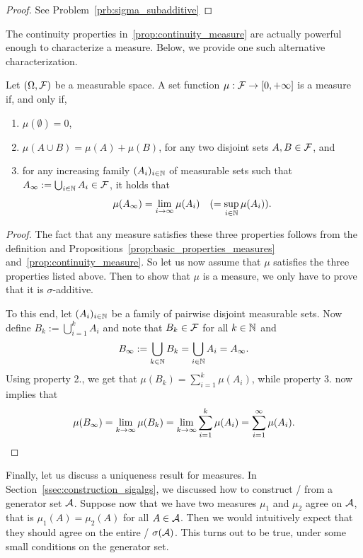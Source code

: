 \begin{proof}
See Problem~\ref{prb:sigma_subadditive}
\end{proof}

The continuity properties in~\ref{prop:continuity_measure} are actually powerful enough to characterize a measure. Below, we provide one such alternative characterization.

\pagebreak
\begin{theorem}\label{thm:measure_equivalent_def}
Let $(\Omega, \mathcal F)$ be a measurable space. A set function $\mu : \mathcal F \to [0,+\infty]$ is a measure if, and only if,
\begin{enumerate}
\item $\mu(\emptyset) = 0$,
\item $\mu(A \cup B) = \mu(A) + \mu(B)$, for any two disjoint sets $A, B \in \mathcal F$, and
\item for any increasing family  $(A_i)_{i \in \mathbb N}$ of measurable sets such that $A_\infty := \bigcup_{i \in \mathbb N} A_i \in \mathcal F$, it holds that
\[
	\mu(A_\infty) = \lim_{i \to \infty} \mu(A_i) \quad (= \sup_{i \in \mathbb N} \mu(A_i)).
\]
\end{enumerate}
\end{theorem}

\begin{proof}
The fact that any measure satisfies these three properties follows from the definition and Propositions~\ref{prop:basic_properties_measures} and~\ref{prop:continuity_measure}. So let us now assume that $\mu$ satisfies the three properties listed above. Then to show that $\mu$ is a measure, we only have to prove that it is $\sigma$-additive.

To this end, let $(A_i)_{i \in \mathbb N}$ be a family of pairwise disjoint measurable sets. Now define $B_k := \bigcup_{i = 1}^k A_i$ and note that $B_k \in \mathcal F$ for all $k \in \mathbb N$ and
\[
	B_\infty := \bigcup_{k \in \mathbb N} B_k = \bigcup_{i \in \mathbb N} A_i = A_\infty.
\]
Using property 2., we get that $\mu(B_k) = \sum_{i = 1}^k \mu(A_i)$, while property 3. now implies that
\[
	\mu(B_\infty) = \lim_{k \to \infty} \mu(B_k) = \lim_{k \to \infty} \sum_{i = 1}^k \mu(A_i) = \sum_{i = 1}^\infty \mu(A_i). \qedhere
\]
\end{proof}

Finally, let us discuss a uniqueness result for measures. In Section~\ref{ssec:construction_sigalgs}, we discussed how to construct \sigalgs/ from a generator set $\mathcal A$. Suppose now that we have two measures $\mu_1$ and $\mu_2$ agree on $\mathcal A$, that is $\mu_1(A) = \mu_2(A)$ for all $A \in \mathcal A$. Then we would intuitively expect that they should agree on the entire \sigalg/ $\sigma(\mathcal A)$. This turns out to be true, under some small conditions on the generator set.

